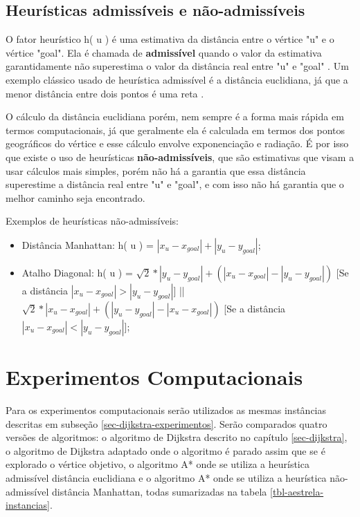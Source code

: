 \subsection{Heurísticas admissíveis e não-admissíveis}
\label{sec-aestrela-algoritmo-heuristica}  
O fator heurístico h( u ) é uma estimativa da distância entre o vértice "u" e o vértice "goal". Ela é chamada de \textbf{admissível} quando o valor da estimativa garantidamente não superestima o valor da distância real entre "u" e "goal" \cite{russell1995modern}. Um exemplo clássico usado de heurística admissível é a distância euclidiana, já que a menor distância entre dois pontos é uma reta \cite{russell1995modern}.

O cálculo da distância euclidiana porém, nem sempre é a forma mais rápida em termos computacionais, já que geralmente ela é calculada em termos dos pontos geográficos do vértice e esse cálculo envolve exponenciação e radiação. É por isso que existe o uso de heurísticas \textbf{não-admissíveis}, que são estimativas que visam a usar cálculos mais simples, porém não há a garantia que essa distância superestime a distância real entre "u" e "goal", e com isso não há garantia que o melhor caminho seja encontrado.

Exemplos de heurísticas não-admissíveis:
\begin{itemize}
\item Distância Manhattan: h( u ) = $| x_{u} - x_{goal} | + | y_{u} - y_{goal}|$;
\item Atalho Diagonal: h( u ) = $\sqrt{2} * | y_{u} - y_{goal}| + ( | x_{u} - x_{goal} | - | y_{u} - y_{goal}| )$ [Se a distância $| x_{u} - x_{goal} | > | y_{u} - y_{goal}|$] || $\sqrt{2} * | x_{u} - x_{goal}| + ( | y_{u} - y_{goal}| - | x_{u} - x_{goal} | )$ [Se a distância $| x_{u} - x_{goal} | < | y_{u} - y_{goal}|$];
\end{itemize}

\section{Experimentos Computacionais}
\label{sec-aestrela-experimentos}

Para os experimentos computacionais serão utilizados as mesmas instâncias descritas em subseção \ref{sec-dijkstra-experimentos}. Serão comparados quatro versões de algoritmos: o algoritmo de Dijkstra descrito no capítulo \ref{sec-dijkstra}, o algoritmo de Dijkstra adaptado onde o algoritmo é parado assim que se é explorado o vértice objetivo, o algoritmo A* onde se utiliza a heurística admissível distância euclidiana e o algoritmo A* onde se utiliza a heurística não-admissível distância Manhattan, todas sumarizadas na tabela \ref{tbl-aestrela-instancias}.

